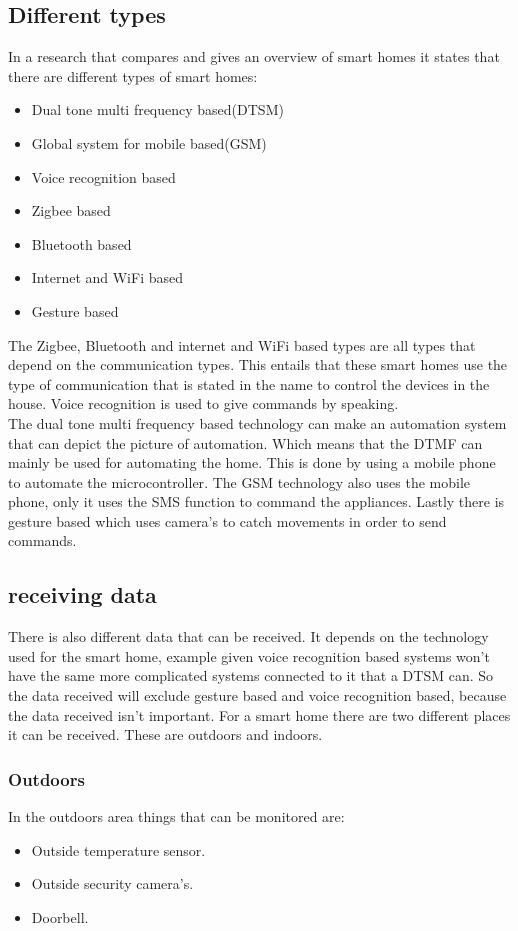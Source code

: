 \subsection{Different types}
In a research\cite{SmartHomecompare} that compares and gives an overview of smart homes it states that there are different types of smart homes:
\begin{itemize}
    \item Dual tone multi frequency based(DTSM)
    \item Global system for mobile based(GSM)
    \item Voice recognition based
    \item Zigbee based
    \item Bluetooth based
    \item Internet and WiFi based
    \item Gesture based
\end{itemize}
The Zigbee, Bluetooth and internet and WiFi based types are all types that depend on the communication types. This entails that these smart homes use the type of communication that is stated in the name to control the devices in the house. Voice recognition is used to give commands by speaking. \\
The dual tone multi frequency based technology can make an automation system that can depict the picture of automation\cite{DualToneSH}. Which means that the DTMF can mainly be used for automating the home. This is done by using a mobile phone to automate the microcontroller\cite{SmartHomecompare}. The GSM technology also uses the mobile phone, only it uses the SMS function to command the appliances. Lastly there is gesture based which uses camera's to catch movements in order to send commands.\\

\subsection{receiving data}
\label{ss:receiving_data_research}
There is also different data that can be received. It depends on the technology used for the smart home, example given voice recognition based systems won't have the same more complicated systems connected to it that a DTSM can. So the data received will exclude gesture based and voice recognition based, because the data received isn't important. For a smart home there are two different places it can be received. These are outdoors and indoors\cite{SmartHomeTech}.
\subsubsection{Outdoors}
In the outdoors area things that can be monitored are:
\begin{itemize}
    \item Outside temperature sensor.
    \item Outside security camera's.
    \item Doorbell.
\end{itemize}

